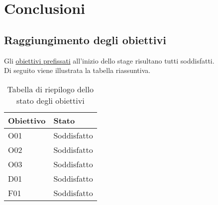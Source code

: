 
\chapter{Conclusioni}
\label{cap:conclusioni}

\section{Raggiungimento degli obiettivi}
Gli \hyperref[cap:descrizione-stage]{obiettivi prefissati} all'inizio dello stage risultano tutti soddisfatti. \\
Di seguito viene illustrata la tabella riassuntiva.
\begin{longtable}{| p{} | p{} |}
\caption{Tabella di riepilogo dello stato degli obiettivi}
\label{tab:stato-obiettivi}
\hline

\textbf{Obiettivo} & \textbf{Stato}\\

\hline

O01     & Soddisfatto \\

\hline

O02     & Soddisfatto \\

\hline

O03     & Soddisfatto \\

\hline

D01     & Soddisfatto \\

\hline

F01     & Soddisfatto \\

\hline

\end{longtable}

